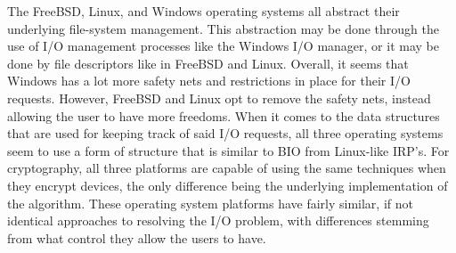 \documentclass[letterpaper,10pt,fleqn,draftclsnofoot,onecolumn]{IEEEtran}
\begin{document}
The FreeBSD, Linux, and Windows operating systems all abstract their underlying file-system management. This abstraction may be done through the use of I/O management processes like the Windows I/O manager, or it may be done by file descriptors like in FreeBSD and Linux. Overall, it seems that Windows has a lot more safety nets and restrictions in place for their I/O requests. However, FreeBSD and Linux opt to remove the safety nets, instead allowing the user to have more freedoms. When it comes to the data structures that are used for keeping track of said I/O requests, all three operating systems seem to use a form of structure that is similar to BIO from Linux-like IRP’s. For cryptography, all three platforms are capable of using the same techniques when they encrypt devices, the only difference being the underlying implementation of the algorithm. These operating system platforms have fairly similar, if not identical approaches to resolving the I/O problem, with differences stemming from what control they allow the users to have.


	\nocite{*}
	
	
\end{document}
